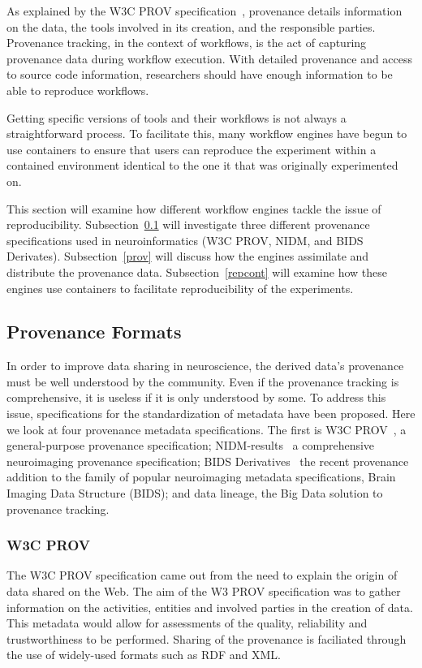             As explained by the W3C PROV specification~\cite{missier2013w3c},
            provenance details information on the data, the tools involved in
            its creation, and the responsible parties. Provenance tracking, in
            the context of workflows, is the act of capturing provenance data
            during workflow execution. With detailed provenance and access to
            source code information, researchers should have enough information
            to be able to reproduce workflows. 

        Getting specific versions of tools and their workflows is not always a
        straightforward process. To facilitate this, many workflow engines have
        begun to use containers to ensure that users can reproduce the
        experiment within a contained environment identical to the one it that
        was originally experimented on. 

        This section will examine how different workflow engines tackle the
        issue of reproducibility. Subsection~\ref{metadata} will investigate three
        different provenance specifications used in neuroinformatics (W3C PROV,
        NIDM, and BIDS Derivates). Subsection~\ref{prov} will discuss how the
        engines assimilate and distribute the provenance data.
        Subsection~\ref{repcont} will examine how these engines use containers to
        facilitate reproducibility of the experiments. \subsection{Provenance
        Formats}\label{metadata} In order to improve data sharing in
        neuroscience, the derived data's provenance must be well understood by
        the community. Even if the provenance tracking is comprehensive, it is
        useless if it is only understood by some. To address this issue,
        specifications for the standardization of metadata have been proposed.
        Here we look at four provenance metadata specifications. The first is
        W3C PROV~\cite{missier2013w3c}, a general-purpose provenance
        specification; NIDM-results~\cite{Maumet:2016aa} a comprehensive
        neuroimaging provenance specification; BIDS Derivatives~\cite{bidsderiv}
        the recent provenance addition to the family of popular neuroimaging
        metadata specifications, Brain Imaging Data Structure (BIDS); and data
        lineage, the Big Data solution to provenance tracking.

            \subsubsection{W3C PROV}
            The W3C PROV specification came out from the need to explain the
            origin of data shared on the Web. The aim of the W3 PROV
            specification was to gather information on the activities, entities
            and involved parties in the creation of data. This metadata would
            allow for assessments of the quality, reliability and
            trustworthiness to be performed. Sharing of the provenance is
            faciliated through the use of widely-used formats such as RDF and
            XML. 

